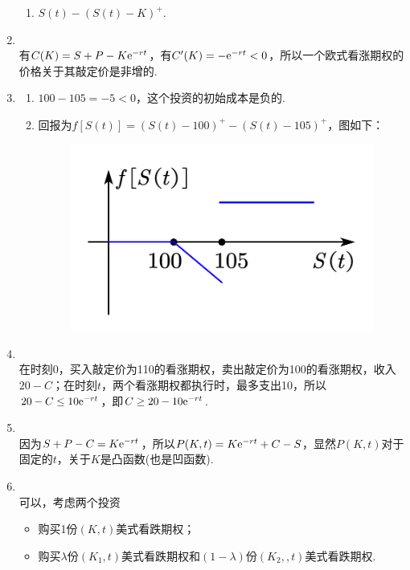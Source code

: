\begin{enumerate}[label=\arabic{section}.\arabic*]
\begin{enumerate}[label=\alph*)]
        \item $S(t)-(S(t)-K)^+$.
    \end{enumerate}
    \item \pro\\
    有$C(K)=S+P-K\mathrm{e}^{-rt}$，有$C'(K)=-\mathrm{e}^{-rt}<0$，所以一个欧式看涨期权的价格关于其敲定价是非增的.
    \item \sol
    \begin{enumerate}[label=\alph*)]
        \item $100-105=-5<0$，这个投资的初始成本是负的.
        \item 回报为$f[S(t)]=(S(t)-100)^+-(S(t)-105)^+$，图如下：
        \begin{figure}[H]
            \centering
            \includegraphics[scale=0.3]{5.22.pdf}
        \end{figure}
    \end{enumerate}
    \item \sol\\
    在时刻0，买入敲定价为110的看涨期权，卖出敲定价为100的看涨期权，收入$20-C$；在时刻$t$，两个看涨期权都执行时，最多支出10，所以$20-C \leq 10\mathrm{e}^{-rt}$，即$C \geq 20-10\mathrm{e}^{-rt}$.
    \item \pro\\ 因为$S+P-C=K\mathrm{e}^{-rt}$，所以$P(K,t)=K\mathrm{e}^{-rt}+C-S$，显然$P(K,t)$对于固定的$t$，关于$K$是凸函数(也是凹函数).
    \item \sol\\ 可以，考虑两个投资
    \begin{itemize}
        \item 购买1份$(K,t)$美式看跌期权；
        \item 购买$\lambda$份$(K_1,t)$美式看跌期权和$(1-\lambda)$份$(K_2,,t)$美式看跌期权.
    \end{itemize}

\end{enumerate}
